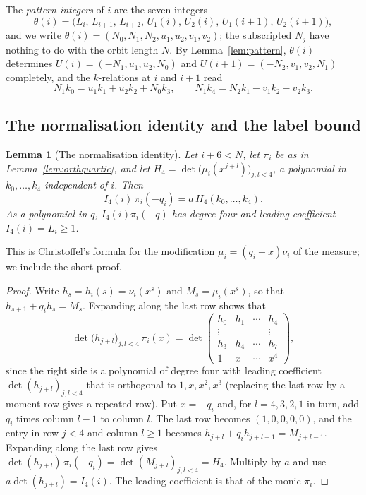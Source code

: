 \documentclass[11pt]{article}
\newtheorem{lemma}[theorem]{Lemma}
\theoremstyle{definition}
\theoremstyle{remark}
\begin{document}
The \emph{pattern integers} of $i$ are the seven integers
\[
\theta(i)=\bigl(L_i,\,L_{i+1},\,L_{i+2},\,U_1(i),\,U_2(i),\,U_1(i+1),\,U_2(i+1)\bigr),
\]
and we write $\theta(i)=(N_0,N_1,N_2,u_1,u_2,v_1,v_2)$; the subscripted $N_j$ have
nothing to do with the orbit length $N$. By Lemma~\ref{lem:pattern},
$\theta(i)$ determines $U(i)=(-N_1,u_1,u_2,N_0)$ and $U(i+1)=(-N_2,v_1,v_2,N_1)$ completely,
and the $k$-relations at $i$ and $i+1$ read
\[
N_1k_0=u_1k_1+u_2k_2+N_0k_3,\qquad N_1k_4=N_2k_1-v_1k_2-v_2k_3 .
\]

\subsection{The normalisation identity and the label bound}\label{sec:normid}

\begin{lemma}[The normalisation identity]\label{lem:multid}
Let $i+6<N$, let $\pi_i$ be as in Lemma~\ref{lem:orthquartic}, and let
$H_4=\det\bigl(\mu_i(x^{j+l})\bigr)_{j,l<4}$, a polynomial in $k_0,\dots,k_4$
independent of $i$. Then
\[
I_4(i)\,\pi_i(-q_i)=a\,H_4(k_0,\dots,k_4).
\]
As a polynomial in $q$, $I_4(i)\pi_i(-q)$ has degree four and leading coefficient
$I_4(i)=L_i\ge1$.
\end{lemma}

This is Christoffel's formula for the modification $\mu_i=(q_i+x)\nu_i$ of
the measure; we include the short proof.

\begin{proof}
Write $h_s=h_i(s)=\nu_i(x^s)$ and $M_s=\mu_i(x^s)$, so that $h_{s+1}+q_ih_s=M_s$.
Expanding along the last row shows that
\[
 \det\bigl(h_{j+l}\bigr)_{j,l<4}\,\pi_i(x)=
 \det\begin{pmatrix}
 h_0&h_1&\cdots&h_4\\
 \vdots&&&\vdots\\
 h_3&h_4&\cdots&h_7\\
 1&x&\cdots&x^4
 \end{pmatrix},
\]
since the right side is a polynomial of degree four with leading coefficient
$\det(h_{j+l})_{j,l<4}$ that is orthogonal to $1,x,x^2,x^3$ (replacing the
last row by a moment row gives a repeated row). Put $x=-q_i$ and, for
$l=4,3,2,1$ in turn, add $q_i$ times column $l-1$ to column $l$. The last row
becomes $(1,0,0,0,0)$, and the entry in row $j<4$ and column $l\ge1$ becomes
$h_{j+l}+q_ih_{j+l-1}=M_{j+l-1}$. Expanding along the last row gives
$\det(h_{j+l})\,\pi_i(-q_i)=\det(M_{j+l})_{j,l<4}=H_4$. Multiply by $a$ and
use $a\det(h_{j+l})=I_4(i)$. The leading coefficient is that of the monic
$\pi_i$.
\end{proof}
\end{document}
